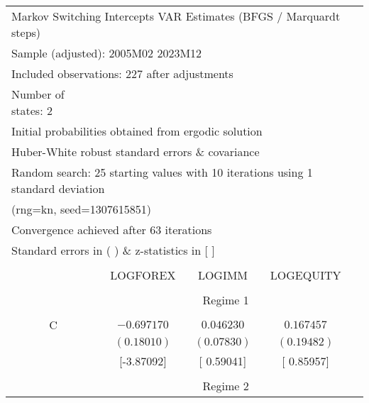 \begin{tabular}{lrrrr}
\multicolumn{5}{l}{Markov Switching Intercepts VAR Estimates (BFGS / Marquardt steps)}\\
\multicolumn{3}{l}{Sample (adjusted): 2005M02 2023M12}&\multicolumn{1}{c}{}&\multicolumn{1}{c}{}\\
\multicolumn{3}{l}{Included observations: 227 after adjustments}&\multicolumn{1}{c}{}&\multicolumn{1}{c}{}\\
\multicolumn{1}{l}{Number of states: 2}&\multicolumn{1}{c}{}&\multicolumn{1}{c}{}&\multicolumn{1}{c}{}&\multicolumn{1}{c}{}\\
\multicolumn{4}{l}{Initial probabilities obtained from ergodic solution}&\multicolumn{1}{c}{}\\
\multicolumn{4}{l}{Huber-White robust standard errors \& covariance}&\multicolumn{1}{c}{}\\
\multicolumn{6}{l}{Random search: 25 starting values with 10 iterations using 1 standard deviation}\\
\multicolumn{2}{l}{(rng=kn, seed=1307615851)}&\multicolumn{1}{c}{}&\multicolumn{1}{c}{}&\multicolumn{1}{c}{}\\
\multicolumn{3}{l}{Convergence achieved after 63 iterations}&\multicolumn{1}{c}{}&\multicolumn{1}{c}{}\\
\multicolumn{3}{l}{Standard errors in ( ) \& z-statistics in [ ]}&\multicolumn{1}{c}{}&\multicolumn{1}{c}{}\\
[4.5pt] \hline \\ [-4.5pt]
\multicolumn{1}{c}{}&\multicolumn{1}{c}{LOGFOREX}&\multicolumn{1}{c}{LOGIMM}&\multicolumn{1}{c}{LOGEQUITY}&\multicolumn{1}{c}{}\\
[4.5pt] \hline \\ [-4.5pt]
\multicolumn{1}{c}{}&\multicolumn{3}{c}{Regime 1}&\multicolumn{1}{c}{}\\
[4.5pt] \hline \\ [-4.5pt]
\multicolumn{1}{c}{C}&\multicolumn{1}{c}{$-0.697170$}&\multicolumn{1}{c}{$0.046230$}&\multicolumn{1}{c}{$0.167457$}&\multicolumn{1}{c}{}\\
\multicolumn{1}{c}{}&\multicolumn{1}{c}{$(0.18010)$}&\multicolumn{1}{c}{$(0.07830)$}&\multicolumn{1}{c}{$(0.19482)$}&\multicolumn{1}{c}{}\\
\multicolumn{1}{c}{}&\multicolumn{1}{c}{[-3.87092]}&\multicolumn{1}{c}{[ 0.59041]}&\multicolumn{1}{c}{[ 0.85957]}&\multicolumn{1}{c}{}\\
[4.5pt] \hline \\ [-4.5pt]
\multicolumn{1}{c}{}&\multicolumn{3}{c}{Regime 2}&\multicolumn{1}{c}{}\\

\end{tabular}
